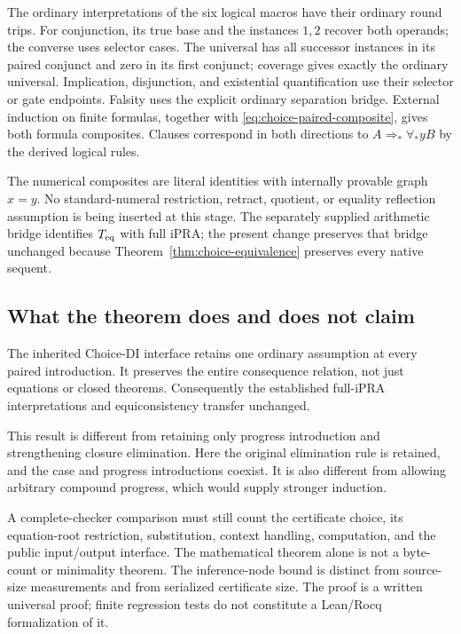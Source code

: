 \documentclass[11pt]{article}
\theoremstyle{definition}
\theoremstyle{remark}
\begin{document}
The ordinary interpretations of the six logical macros
have their ordinary round trips. For conjunction, its true
base and the instances $1,2$ recover both operands;
the converse uses selector cases. The universal has all
successor instances in its paired conjunct and zero in
its first conjunct; coverage gives exactly the ordinary
universal. Implication, disjunction, and existential
quantification use their selector or gate endpoints.
Falsity uses the explicit ordinary separation bridge.
External induction on finite formulas, together with
\eqref{eq:choice-paired-composite}, gives both formula
composites. Clauses correspond in both directions to
$A\Rightarrow_*\forall_*yB$ by the derived logical rules.

The numerical composites are literal identities with
internally provable graph $x=y$. No standard-numeral
restriction, retract, quotient, or equality reflection
assumption is being inserted at this stage. The separately
supplied arithmetic bridge identifies $T_{\rm eq}$ with
full iPRA; the present change preserves that bridge
unchanged because Theorem~\ref{thm:choice-equivalence}
preserves every native sequent.

\subsection{What the theorem does and does not claim}

The inherited Choice-DI interface retains one ordinary assumption
at every paired introduction. It preserves the entire
consequence relation, not just equations or closed
theorems. Consequently the established full-iPRA
interpretations and equiconsistency transfer unchanged.

This result is different from retaining only progress
introduction and strengthening closure elimination.
Here the original elimination rule is retained, and
the case and progress introductions coexist. It is also
different from allowing arbitrary compound progress,
which would supply stronger induction.

A complete-checker comparison must still count the
certificate choice, its equation-root restriction,
substitution, context handling, computation, and the
public input/output interface. The mathematical theorem
alone is not a byte-count or minimality theorem.
The inference-node bound is distinct from source-size
measurements and from serialized certificate size.
The proof is a written universal proof; finite regression
tests do not constitute a Lean/Rocq formalization of it.
\end{document}
